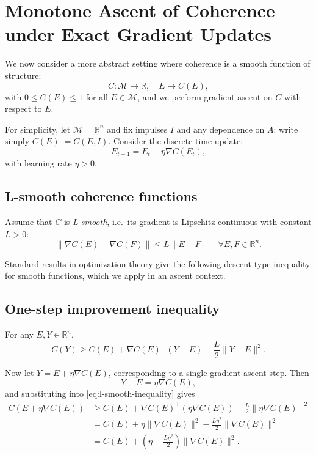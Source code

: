 \documentclass[12pt,a4paper]{report}
\begin{document}
\section{Monotone Ascent of Coherence under Exact Gradient Updates}

We now consider a more abstract setting where coherence is a smooth function of structure:
\[
    C : \mathcal{M} \to \mathbb{R}, \quad E \mapsto C(E),
\]
with \(0 \le C(E) \le 1\) for all \(E \in \mathcal{M}\), and we perform gradient ascent on \(C\) with respect to \(E\).

For simplicity, let \(\mathcal{M} = \mathbb{R}^n\) and fix impulses \(I\) and any dependence on \(A\): write simply \(C(E) := C(E, I)\). Consider the discrete-time update:
\begin{equation}
    E_{t+1} = E_t + \eta \nabla C(E_t),
    \label{eq:gradient-ascent}
\end{equation}
with learning rate \(\eta > 0\).

\subsection*{L-smooth coherence functions}

Assume that \(C\) is \emph{L-smooth}, i.e.\ its gradient is Lipschitz continuous with constant \(L > 0\):
\begin{equation}
    \|\nabla C(E) - \nabla C(F)\| \le L \|E - F\| \quad \forall E, F \in \mathbb{R}^n.
\end{equation}

Standard results in optimization theory give the following descent-type inequality for smooth functions, which we apply in an ascent context.

\subsection*{One-step improvement inequality}

For any \(E, Y \in \mathbb{R}^n\),
\begin{equation}
    C(Y) \ge C(E) + \nabla C(E)^\top (Y - E) - \frac{L}{2} \|Y - E\|^2.
    \label{eq:l-smooth-inequality}
\end{equation}

Now let \(Y = E + \eta \nabla C(E)\), corresponding to a single gradient ascent step. Then
\[
    Y - E = \eta \nabla C(E),
\]
and substituting into \eqref{eq:l-smooth-inequality} gives
\begin{align}
    C(E + \eta \nabla C(E))
    &\ge C(E) + \nabla C(E)^\top (\eta \nabla C(E))
       - \frac{L}{2} \|\eta \nabla C(E)\|^2 \\
    &= C(E) + \eta \|\nabla C(E)\|^2 - \frac{L\eta^2}{2} \|\nabla C(E)\|^2 \\
    &= C(E) + \left(\eta - \frac{L\eta^2}{2}\right) \|\nabla C(E)\|^2.
\end{align}
\end{document}
